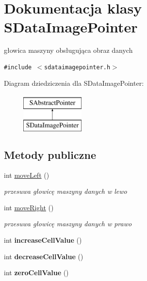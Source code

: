 \hypertarget{classSDataImagePointer}{
\section{Dokumentacja klasy SDataImagePointer}
\label{classSDataImagePointer}
}
głowica maszyny obsługująca obraz danych  


{\tt \#include $<$sdataimagepointer.h$>$}

Diagram dziedziczenia dla SDataImagePointer:\begin{figure}[H]
\begin{center}
\leavevmode
\includegraphics[height=2cm]{classSDataImagePointer}
\end{center}
\end{figure}
\subsection*{Metody publiczne}
\begin{CompactItemize}
\item 
int \hyperlink{classSDataImagePointer_87bb92d4bb0336b4723c64d03df9987c}{moveLeft} ()
\begin{CompactList}\small\item\em przesuwa głowicę maszyny danych w lewo \item\end{CompactList}\item 
int \hyperlink{classSDataImagePointer_9cc51881224c9e157e96d5e36189e54a}{moveRight} ()
\begin{CompactList}\small\item\em przesuwa głowicę maszyny danych w prawo \item\end{CompactList}\item 
\hypertarget{classSDataImagePointer_0cdd7239181d6f12bf6df551defaa769}{
int \textbf{increaseCellValue} ()}
\label{classSDataImagePointer_0cdd7239181d6f12bf6df551defaa769}

\item 
\hypertarget{classSDataImagePointer_0461b9855715a2d296e19865517f7f36}{
int \textbf{decreaseCellValue} ()}
\label{classSDataImagePointer_0461b9855715a2d296e19865517f7f36}

\item 
\hypertarget{classSDataImagePointer_ee071148492c43291fd01fd035f6398a}{
int \textbf{zeroCellValue} ()}
\label{classSDataImagePointer_ee071148492c43291fd01fd035f6398a}

\end{CompactItemize}



